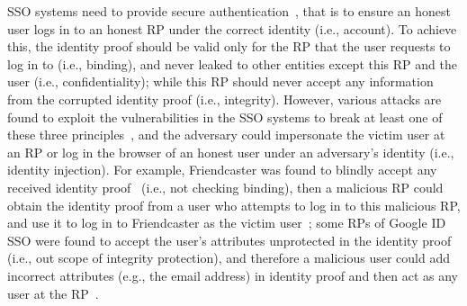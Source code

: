 SSO systems need to provide secure authentication~\cite{SPRESSO}, that is to ensure an honest user logs in to an honest RP under the correct identity (i.e., account).
To achieve this, the identity proof should be valid only for the RP that the user requests to log in to (i.e., binding),
  and never leaked to other entities except this RP and the user (i.e., confidentiality);
   while this RP should never accept any information from the corrupted identity proof (i.e., integrity).
However, various attacks are found to exploit the vulnerabilities in the SSO systems to break at least one of these three principles~\cite{ChenPCTKT14, FettKS16,WangCW12,ZhouE14,WangZLG16,YangLLZH16,SomorovskyMSKJ12,MohsenS16}, and the adversary could impersonate the victim user at an RP or log in the browser of an honest user under an adversary’s identity (i.e., identity injection).
For example, Friendcaster was found to blindly accept any received identity proof~\cite{ExplicatingSDK,ChenPCTKT14} (i.e., not checking binding), then a malicious RP could obtain the identity proof from a user who attempts to log in to this malicious RP, and use it to log in to Friendcaster as the victim user~\cite{MohsenS16};
some RPs of Google ID SSO were found to accept the user's attributes unprotected in the identity proof (i.e., out scope of  integrity protection), and therefore a malicious user could add incorrect attributes (e.g., the email address) in identity proof and then act as any user at the RP~\cite{WangCW12}.

